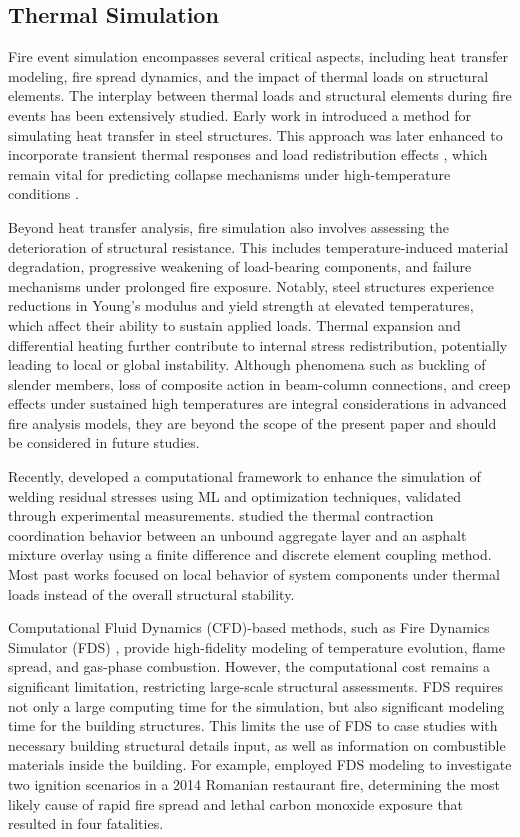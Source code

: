 {\subsection{Thermal Simulation}
Fire event simulation encompasses several critical aspects, including heat transfer modeling, fire spread dynamics, and the impact of thermal loads on structural elements.
The interplay between thermal loads and structural elements during fire events has been extensively studied. Early work in \cite{anderberg1988modelling} introduced a method for simulating heat transfer in steel structures. This approach was later enhanced to incorporate transient thermal responses and load redistribution effects \cite{kodur2010response}, which remain vital for predicting collapse mechanisms under high-temperature conditions \cite{franssen2002fire}.

Beyond heat transfer analysis, fire simulation also involves assessing the deterioration of structural resistance. This includes temperature-induced material degradation, progressive weakening of load-bearing components, and failure mechanisms under prolonged fire exposure. Notably, steel structures experience reductions in Young’s modulus and yield strength at elevated temperatures, which affect their ability to sustain applied loads. Thermal expansion and differential heating further contribute to internal stress redistribution, potentially leading to local or global instability. Although phenomena such as buckling of slender members, loss of composite action in beam-column connections, and creep effects under sustained high temperatures are integral considerations in advanced fire analysis models, they are beyond the scope of the present paper and should be considered in future studies. 

Recently, \cite{wang_optimizationimproved_2024} developed a computational framework to enhance the simulation of welding residual stresses using ML and optimization techniques, validated through experimental measurements. \cite{wan_thermal_2024} studied the thermal contraction coordination behavior between an unbound aggregate layer and an asphalt mixture overlay using a finite difference and discrete element coupling method. Most past works focused on local behavior of system components under thermal loads instead of the overall structural stability.

Computational Fluid Dynamics (CFD)-based methods, such as Fire Dynamics Simulator (FDS) \cite{mcgrattan_fire_2000}, provide high-fidelity modeling of temperature evolution, flame spread, and gas-phase combustion. However, the computational cost remains a significant limitation, restricting large-scale structural assessments. FDS requires not only a large computing time for the simulation, but also significant modeling time for the building structures. This limits the use of FDS to case studies with necessary building structural details input, as well as information on combustible materials inside the building. For example, \cite{manea_fds_2022} employed FDS modeling to investigate two ignition scenarios in a 2014 Romanian restaurant fire, determining the most likely cause of rapid fire spread and lethal carbon monoxide exposure that resulted in four fatalities.

}
